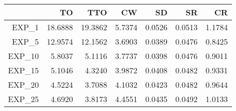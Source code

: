 \begin{tabular}{rrrrrrr}
  \toprule
 & TO & TTO & CW & SD & SR & CR \\ 
  \midrule
EXP\_1 & 18.6888 & 19.3862 & 5.7374 & 0.0526 & 0.0513 & 1.1784 \\ 
  EXP\_5 & 12.9574 & 12.1562 & 3.6903 & 0.0389 & 0.0476 & 0.8425 \\ 
  EXP\_10 & 5.8037 & 5.1116 & 3.7737 & 0.0398 & 0.0476 & 0.9011 \\ 
  EXP\_15 & 5.1046 & 4.3240 & 3.9872 & 0.0408 & 0.0482 & 0.9331 \\ 
  EXP\_20 & 4.5224 & 3.7088 & 4.1032 & 0.0423 & 0.0482 & 0.9644 \\ 
  EXP\_25 & 4.6920 & 3.8173 & 4.4551 & 0.0435 & 0.0492 & 1.0133 \\ 
   \bottomrule
\end{tabular}
